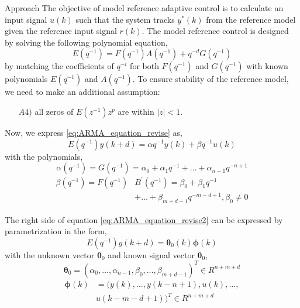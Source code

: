 \begin{section}{Approach}
The objective of model reference adaptive control is to calculate an input signal $u(k)$ such that the system tracks $y^{*}(k)$ from the reference model given the reference input signal $r(k)$. The model reference control is designed by solving the following polynomial equation,
    \begin{equation}
	E(q^{-1})=F(q^{-1})A(q^{-1})+q^{-d}G(q^{-1})
	\end{equation}
by matching the coefficients of $q^{-i}$ for both $F(q^{-1})$ and $G(q^{-1})$ with  known polynomials $E(q^{-1})$ and $A(q^{-1})$.
To ensure stability of the reference model, we need to make an additional assumption:
    \begin{enumerate}[leftmargin=4\parindent]
	\item[$A4)$] all zeros of $E(z^{-1})z^p$ are within $|z|<1$. 
	\end{enumerate}	
Now, we express \eqref{eq:ARMA_equation_revise} as,
	\begin{equation}
	\label{eq:ARMA_equation_revise2}
	E(q^{-1})y(k+d)={\alpha}q^{-1}y(k) + {\beta}q^{-1}u(k)
	\end{equation}
with the polynomials,
	\begin{equation}
	\alpha(q^{-1})=G(q^{-1})=\alpha_0+\alpha_1q^{-1}+ \dots +\alpha_{n-1}q^{-n+1}
	\end{equation}
	\begin{align}
	\beta( q^{-1})= F(q^{-1})&B^{'}(q^{-1})=\beta_0+\beta_1q^{-1} \nonumber \\
	& + \dots +\beta_{m+d-1}q^{-m-d+1}, \beta_0\neq0
	\end{align}

The right side of equation \eqref{eq:ARMA_equation_revise2} can be expressed by parametrization in the form,
    \begin{equation}
	E(q^{-1})y(k+d)=\bm{\theta}_0(k)\bm{\phi}(k)
	\end{equation}
with the unknown vector $\bm{\theta}_0$ and known signal vector $\bm{\theta}_0$,
    \begin{equation}
	\bm{\theta}_0=(\alpha_0, \dots ,\alpha_{n-1},\beta_0, \dots ,\beta_{m+d-1})^T \in R^{n+m+d}
	\end{equation}
	\begin{align}
	\bm{\phi}(k)&=(y(k), \dots ,y(k-n+1),u(k), \dots , \nonumber \\
	& u(k-m-d+1))^T \in R^{n+m+d}
	\end{align}
	

\end{section}
